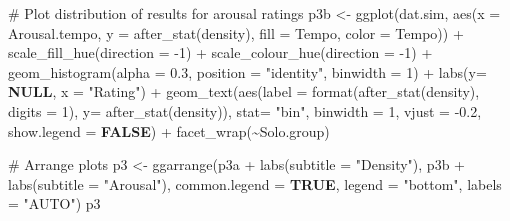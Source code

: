 \documentclass[
  bookmarksnumbered]{article}
\newenvironment{Shaded}{\begin{snugshade}}{\end{snugshade}}
\newcommand{\AttributeTok}[1]{\textcolor[rgb]{0.80,0.80,0.80}{#1}}
\newcommand{\CommentTok}[1]{\textcolor[rgb]{0.50,0.62,0.50}{#1}}
\newcommand{\ConstantTok}[1]{\textcolor[rgb]{0.86,0.64,0.64}{\textbf{#1}}}
\newcommand{\DecValTok}[1]{\textcolor[rgb]{0.86,0.86,0.80}{#1}}
\newcommand{\FloatTok}[1]{\textcolor[rgb]{0.75,0.75,0.82}{#1}}
\newcommand{\FunctionTok}[1]{\textcolor[rgb]{0.94,0.94,0.56}{#1}}
\newcommand{\NormalTok}[1]{\textcolor[rgb]{0.80,0.80,0.80}{#1}}
\newcommand{\OtherTok}[1]{\textcolor[rgb]{0.94,0.94,0.56}{#1}}
\newcommand{\SpecialCharTok}[1]{\textcolor[rgb]{0.86,0.64,0.64}{#1}}
\newcommand{\StringTok}[1]{\textcolor[rgb]{0.80,0.58,0.58}{#1}}
\begin{document}
\begin{Shaded}
\begin{Highlighting}[]
\CommentTok{\# Plot distribution of results for arousal ratings}
\NormalTok{p3b }\OtherTok{\textless{}{-}} \FunctionTok{ggplot}\NormalTok{(dat.sim, }\FunctionTok{aes}\NormalTok{(}\AttributeTok{x =}\NormalTok{ Arousal.tempo, }\AttributeTok{y =} \FunctionTok{after\_stat}\NormalTok{(density),}
                           \AttributeTok{fill =}\NormalTok{ Tempo, }\AttributeTok{color =}\NormalTok{ Tempo)) }\SpecialCharTok{+}
  \FunctionTok{scale\_fill\_hue}\NormalTok{(}\AttributeTok{direction =} \SpecialCharTok{{-}}\DecValTok{1}\NormalTok{) }\SpecialCharTok{+} \FunctionTok{scale\_colour\_hue}\NormalTok{(}\AttributeTok{direction =} \SpecialCharTok{{-}}\DecValTok{1}\NormalTok{) }\SpecialCharTok{+}
  \FunctionTok{geom\_histogram}\NormalTok{(}\AttributeTok{alpha =} \FloatTok{0.3}\NormalTok{, }\AttributeTok{position =} \StringTok{"identity"}\NormalTok{, }\AttributeTok{binwidth =} \DecValTok{1}\NormalTok{) }\SpecialCharTok{+}
  \FunctionTok{labs}\NormalTok{(}\AttributeTok{y=} \ConstantTok{NULL}\NormalTok{, }\AttributeTok{x =} \StringTok{"Rating"}\NormalTok{) }\SpecialCharTok{+}
  \FunctionTok{geom\_text}\NormalTok{(}\FunctionTok{aes}\NormalTok{(}\AttributeTok{label =} \FunctionTok{format}\NormalTok{(}\FunctionTok{after\_stat}\NormalTok{(density), }\AttributeTok{digits =} \DecValTok{1}\NormalTok{), }\AttributeTok{y=} \FunctionTok{after\_stat}\NormalTok{(density)), }
            \AttributeTok{stat=} \StringTok{"bin"}\NormalTok{, }\AttributeTok{binwidth =} \DecValTok{1}\NormalTok{, }
            \AttributeTok{vjust =} \SpecialCharTok{{-}}\FloatTok{0.2}\NormalTok{,}
            \AttributeTok{show.legend =} \ConstantTok{FALSE}\NormalTok{) }\SpecialCharTok{+}
  \FunctionTok{facet\_wrap}\NormalTok{(}\SpecialCharTok{\textasciitilde{}}\NormalTok{Solo.group)}

\CommentTok{\# Arrange plots}
\NormalTok{p3 }\OtherTok{\textless{}{-}} \FunctionTok{ggarrange}\NormalTok{(p3a }\SpecialCharTok{+}
                  \FunctionTok{labs}\NormalTok{(}\AttributeTok{subtitle =} \StringTok{"Density"}\NormalTok{), }
\NormalTok{                p3b  }\SpecialCharTok{+}
                  \FunctionTok{labs}\NormalTok{(}\AttributeTok{subtitle =} \StringTok{"Arousal"}\NormalTok{),}
                \AttributeTok{common.legend =} \ConstantTok{TRUE}\NormalTok{,}
                \AttributeTok{legend =} \StringTok{"bottom"}\NormalTok{,}
                \AttributeTok{labels =} \StringTok{"AUTO"}\NormalTok{)}
\NormalTok{p3}
\end{Highlighting}
\end{Shaded}
\end{document}
